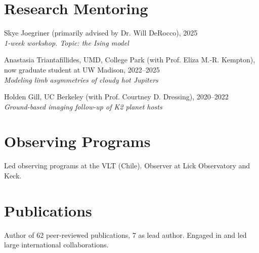 \documentclass[letterpaper,11pt]{article}
\newcommand{\resumeSubHeadingListStart}{\begin{itemize}[leftmargin=*]}
\newcommand{\shorterSection}[1]{\vspace{-10pt}\section{#1}}
\newcommand{\shortershorterSection}[1]{\vspace{-10pt}\subsection{#1}}
\begin{document}
  


%     



  \shorterSection{Research Mentoring}
\small
  \begin{list}{}{\cvlist}  

  \item[{\color{numcolor}}]Skye Joegriner (primarily advised by Dr. Will DeRocco), 2025 \\
    \textit{1-week workshop. Topic: the Ising model}
  \item[{\color{numcolor}}]Anastasia Triantafillides, UMD, College Park (with Prof. Eliza M.-R. Kempton), now graduate student at UW Madison, 2022--2025 \\
  \textit{Modeling limb asymmetries of cloudy hot Jupiters}
  \item[{\color{numcolor}}]Holden Gill, UC Berkeley (with Prof. Courtney D. Dressing), 2020--2022 \\
    \textit{Ground-based imaging follow-up of K2 planet hosts}


  \end{list}


  \shorterSection{Observing Programs}
Led observing programs at the VLT (Chile). Observer at Lick Observatory and Keck.


\shorterSection{Publications}
Author of 62 peer-reviewed publications, 7 as lead author. Engaged in and led large international collaborations.

\end{document}
